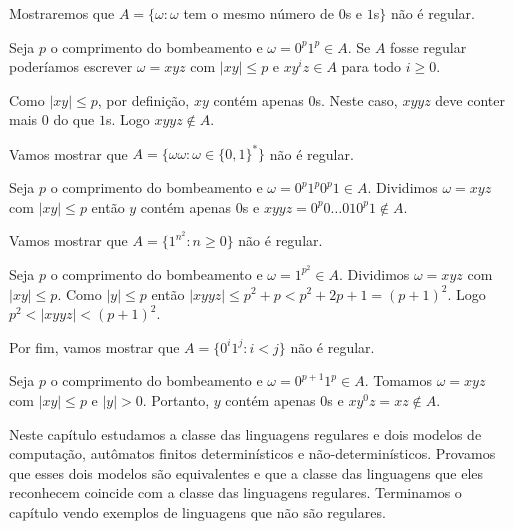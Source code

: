 \begin{example}
  Mostraremos que $A = \{ \omega : \omega$ tem o mesmo número de $0$s e $1$s$\}$ não é regular.

  Seja $p$ o comprimento do bombeamento e $\omega = 0^p 1^p \in A$.
  Se $A$ fosse regular poderíamos escrever $\omega = xyz$ com $|xy| \leq p$ e $x y^i z \in A$ para todo $i \geq 0$.

Como $|xy| \leq p$, por definição, $xy$ contém apenas $0$s.
Neste caso, $xyyz$ deve conter mais $0$ do que $1$s.
Logo $xyyz \notin A$.
\end{example}

\begin{example}
Vamos mostrar que $A = \{\omega \omega : \omega \in \{0,1\}^*\}$ não é regular.

Seja $p$ o comprimento do bombeamento e $\omega = 0^p 1^p 0^p 1 \in A$.
Dividimos $\omega = xyz$ com $|xy| \leq p$ então $y$ contém apenas $0$s e $xyyz = 0^p 0 \dots 0 1 0^p 1 \notin A$.
\end{example}


\begin{example}
  Vamos mostrar que $A = \{ 1^{n^2} : n \geq 0 \}$ não é regular.

  Seja $p$ o comprimento do bombeamento e $\omega = 1^{p^2} \in A$.
  Dividimos $\omega = xyz$ com $|xy| \leq p$.
  Como $|y| \leq p$ então $|xyyz| \leq p^2 + p < p^2 + 2p + 1 = (p + 1)^2$.
  Logo $p^2 < |xyyz| < (p+1)^2$.
\end{example}


\begin{example}
  Por fim, vamos mostrar que $A = \{0^i 1^j : i < j \}$ não é regular.

  Seja $p$ o comprimento do bombeamento e $\omega = 0^{p+1} 1^p \in A$.
  Tomamos $\omega = xyz$ com $|xy| \leq p$ e $|y| > 0$.
  Portanto, $y$ contém apenas $0$s e $xy^0z = xz \notin A$.
\end{example}

Neste capítulo estudamos a classe das linguagens regulares e dois modelos de computação, autômatos finitos determinísticos e não-determinísticos.
Provamos que esses dois modelos são equivalentes e que a classe das linguagens que eles reconhecem coincide com a classe das linguagens regulares.
Terminamos o capítulo vendo exemplos de linguagens que não são regulares.
